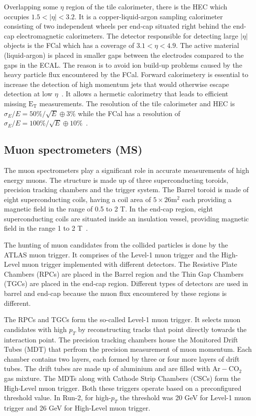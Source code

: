 Overlapping some $\eta$ region of the tile calorimeter, there is the HEC which occupies
$1.5 < |\eta| < 3.2$. It is a copper-liquid-argon sampling calorimeter consisting of two independent wheels per end-cap situated right behind the end-cap electromagnetic
calorimeters. The detector responsible for detecting large $|\eta|$ objects is the FCal which has a coverage of $3.1 < \eta < 4.9$. The active material (liquid-argon) is 
placed in smaller gaps between the electrodes compared to the gaps in the ECAL. The reason is to avoid ion build-up problems caused by the heavy particle flux 
encountered by the FCal. Forward calorimetery is essential to increase the detection of high momentum jets that would otherwise escape detection at low 
$\eta$~\cite{J-P-Archambault_2008}. It allows a hermetic calorimetry that leads to efficient missing $\text{E}_\text{T}$ measurements. The resolution of the tile 
calorimeter and HEC is $\sigma_E/E = 50\%/\sqrt{E} \oplus 3\%$ while the FCal has a resolution of $\sigma_E/E = 100\%/\sqrt{E} \oplus 10\%$~\cite{A-Artamonov_2008}.
 


\subsection{Muon spectrometers (MS)}
The muon spectrometers play a significant role in accurate measurements of high energy muons. The structure is made up of three superconducting toroids, 
precision tracking chambers and the trigger system. The Barrel toroid is made of eight superconducting coils, having a coil area of $5 \times 26 \text{m}^2$ each 
providing a magnetic field in the range of 0.5 to 2 T. In the end-cap region, eight superconducting coils are situated inside an insulation vessel, providing magnetic 
field in the range 1 to 2 T~\cite{Palestini:2003noa}. 

The hunting of muon candidates from the collided particles is done by the ATLAS muon trigger. It comprises of the Level-1 muon trigger and the High-Level muon trigger implemented with 
different detectors. The Resistive Plate Chambers (RPCs) are placed in the Barrel region and the Thin Gap Chambers (TGCs) are placed in the end-cap region. Different types of 
detectors are used in barrel and end-cap because the muon flux encountered by these regions is different. 

The RPCs and TGCs form the so-called Level-1 muon trigger. It selects muon
candidates with high $p_T$ by reconstructing tracks that point directly towards the interaction point. The precision tracking 
chambers house the Monitored Drift Tubes (MDT) that perfrom the precision measurement of muon momentum. Each chamber
contains two layers, each formed by three or four more layers of drift tubes. The drift tubes are made up of aluminium and are filled with $\text{Ar}-\text{CO}_2$ gas mixture.
The MDTs along with Cathode Strip Chambers (CSCs) form the High-Level muon trigger. Both these triggers operate based on a preconfigured threshold value. In Run-2, for high-$p_T$ the 
threshold was 20 GeV for Level-1 muon trigger and 26 GeV for High-Level muon trigger.  


